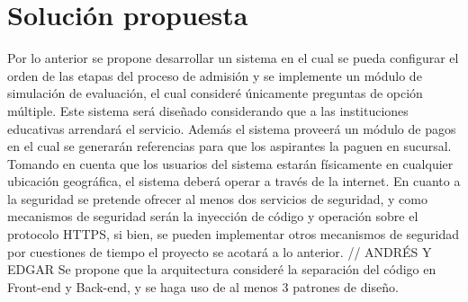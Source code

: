 \section{Solución propuesta}
    
    Por lo anterior se propone desarrollar un sistema en el cual se pueda configurar el orden de las etapas del proceso de admisión y se implemente un módulo de simulación de evaluación, el cual consideré únicamente preguntas de opción múltiple. Este sistema será diseñado considerando que a las instituciones educativas arrendará el servicio. 
    Además el sistema proveerá un módulo de pagos en el cual se generarán referencias para que los aspirantes la paguen en sucursal.
    Tomando en cuenta que los usuarios del sistema estarán físicamente en cualquier ubicación geográfica, el sistema deberá operar a través de la internet. En cuanto a la seguridad se pretende ofrecer al menos dos servicios de seguridad, y como mecanismos de seguridad serán la inyección de código y operación sobre el protocolo HTTPS, si bien, se pueden implementar otros mecanismos de seguridad por cuestiones de tiempo el proyecto se acotará a lo anterior.
    // ANDRÉS Y EDGAR Se propone que la arquitectura consideré la separación del código en Front-end y Back-end, y se haga uso de al menos 3 patrones de diseño.

 